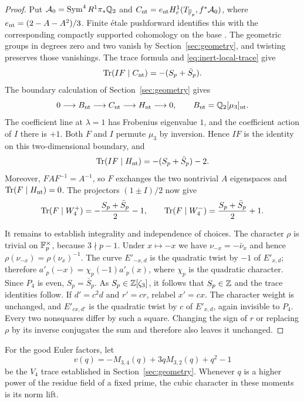 \begin{proof}
Put $\mathcal A_0=\operatorname{Sym}^4R^1\pi_*\mathbb Q_2$ and
$C_{\mathrm{nt}}=e_{\mathrm{nt}}H_c^1(T_{\overline{\mathbb F}_p},f^*\mathcal A_0)$,
where $e_{\mathrm{nt}}=(2-A-A^2)/3$.
Finite \'{e}tale pushforward identifies this with the corresponding
compactly supported cohomology on the base \cite{StacksFinite}.
The geometric groups in degrees zero and two vanish by
Section~\ref{sec:geometry}, and twisting preserves those vanishings.
The trace formula \cite{StacksTrace} and
\eqref{eq:inert-local-trace} give
\[
 \operatorname{Tr}(IF\mid C_{\mathrm{nt}})=-(S_p+\bar S_p).
\]
The boundary calculation of Section~\ref{sec:geometry} gives
\[
 0\longrightarrow B_{\mathrm{nt}}\longrightarrow C_{\mathrm{nt}}
   \longrightarrow H_{\mathrm{nt}}\longrightarrow0,
 \qquad B_{\mathrm{nt}}=\mathbb Q_2[\mu_3]_{\mathrm{nt}}.
\]
The coefficient line at $\lambda=1$ has Frobenius eigenvalue $1$,
and the coefficient action of $I$ there is $+1$.
Both $F$ and $I$ permute $\mu_3$ by inversion. Hence $IF$ is the
identity on this two-dimensional boundary, and
\begin{equation}\label{eq:inert-parabolic-trace}
 \operatorname{Tr}(IF\mid H_{\mathrm{nt}})=-(S_p+\bar S_p)-2.
\end{equation}
Moreover, $FAF^{-1}=A^{-1}$, so $F$ exchanges the two nontrivial
$A$ eigenspaces and $\operatorname{Tr}(F\mid H_{\mathrm{nt}})=0$.
The projectors $(1\pm I)/2$ now give
\[
 \operatorname{Tr}(F\mid W_4^+)=-\frac{S_p+\bar S_p}{2}-1,
 \qquad
 \operatorname{Tr}(F\mid W_4^-)=\frac{S_p+\bar S_p}{2}+1.
\]

It remains to establish integrality and independence of choices.
The character $\rho$ is trivial on $\mathbb F_p^\times$, because
$3\nmid p-1$. Under $x\mapsto-x$ we have
$\nu_{-x}=-\bar\nu_x$ and hence
$\rho(\nu_{-x})=\rho(\nu_x)^{-1}$.
The curve $E'_{-x,d}$ is the quadratic twist by $-1$ of $E'_{x,d}$;
therefore $a'_p(-x)=\chi_p(-1)a'_p(x)$, where $\chi_p$ is the
quadratic character. Since $P_4$ is even, $S_p=\bar S_p$.
As $S_p\in\mathbb Z[\zeta_3]$, it follows that $S_p\in\mathbb Z$ and the
trace identities follow. If $d'=c^2d$ and $r'=cr$, relabel
$x'=cx$. The character weight is unchanged, and $E'_{cx,d'}$
is the quadratic twist by $c$ of $E'_{x,d}$, again invisible to
$P_4$. Every two nonsquares differ by such a square.
Changing the sign of $r$ or replacing $\rho$ by its inverse
conjugates the sum and therefore also leaves it unchanged.
\end{proof}

For the good Euler factors, let
\[
 v(q)=-M_{3,4}(q)+3qM_{3,2}(q)+q^2-1
\]
be the $V_4$ trace established in Section~\ref{sec:geometry}.
Whenever $q$ is a higher power of the residue field of a fixed
prime, the cubic character in these moments is its norm lift.

